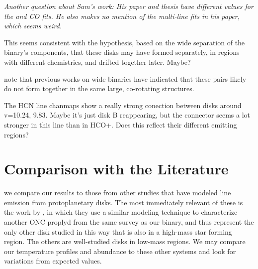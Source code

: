 \textit{Another question about Sam's work: His paper and thesis have different values for the \hco and CO fits. He also makes no mention of the multi-line fits in his paper, which seems weird.}




This seems consistent with the hypothesis, based on the wide separation of the binary's components, that these disks may have formed separately, in regions with different chemistries, and drifted together later. Maybe?

\citet{Williams2014} note that previous works on wide binaries \citep{JensenAkeson2014,Salyk2014} have indicated that these pairs likely do not form together in the same large, co-rotating structures.


The HCN line chanmaps show a really strong conection between disks around v=10.24, 9.83. Maybe it's just disk B reappearing, but the connector seems a lot stronger in this line than in HCO+. Does this reflect their different emitting regions?


\section{Comparison with the Literature}

\cite{table:comparisons} we compare our results to those from other studies that have modeled line emission from protoplanetary disks. The most immediately relevant of these is the work by \citet{Factor2017}, in which they use a similar modeling technique to characterize another ONC proplyd from the same survey as our binary, and thus represent the only other disk studied in this way that is also in a high-mass star forming region. The others are well-studied disks in low-mass regions. We may compare our temperature profiles and abundance to these other systems and look for variations from expected values.


